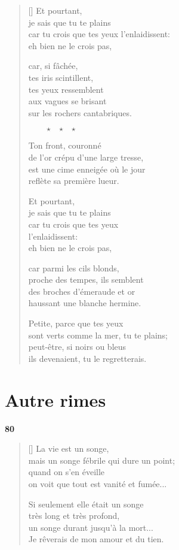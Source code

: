 \documentclass[a4paper,12pt]{book}
\begin{document}
\begin{verse}[\versewidth]
  Et pourtant, \\
  je sais que tu te plains \\
  car tu crois que tes yeux
  l'enlaidissent: \\
  eh bien ne le crois pas,

  car, si fâchée, \\
  tes iris scintillent, \\
  tes yeux ressemblent \\
  aux vagues se brisant \\
  sur les rochers cantabriques.

  $\ \ \ \ \ \ \ \ \ \star \ \ \ \star \ \ \ \star$

  Ton front, couronné \\
  de l'or crépu d'une large tresse, \\
  est une cime enneigée où le jour \\
  reflète sa première lueur.

  Et pourtant, \\
  je sais que tu te plains \\
  car tu crois que tes yeux \\
  l'enlaidissent: \\
  eh bien ne le crois pas,

  car parmi les cils blonds, \\
  proche des tempes, ils semblent \\
  des broches d'émeraude et or \\
  haussant une blanche hermine.

  Petite, parce que tes yeux \\
  sont verts comme la mer, tu te plains; \\
  peut-être, si noirs ou bleus \\
  ils devenaient, tu le regretterais.
\end{verse}

\chapter{Autre rimes}

\begin{center}
  \textbf{80}
\end{center}

\settowidth{\versewidth}{un songe qui durerait jusqu'à la mort...!}

\begin{verse}[\versewidth]
  La vie est un songe, \\
  mais un songe fébrile qui dure un point; \\
  quand on s'en éveille \\
  on voit que tout est vanité et fumée...

  Si seulement elle était un songe \\
  très long et très profond, \\
  un songe durant jusqu'à la mort... \\
  Je rêverais de mon amour et du tien.
\end{verse}
\end{document}
